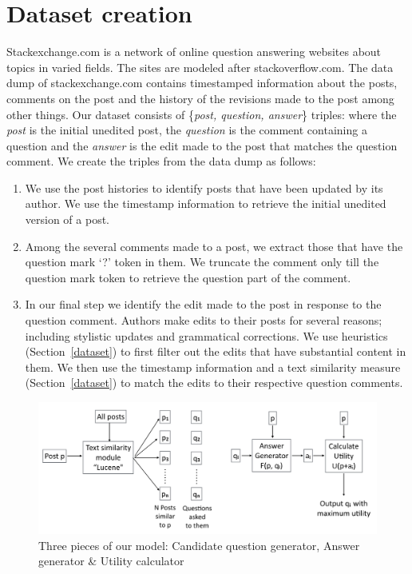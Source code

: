 \documentclass[11pt]{article}
\begin{document}
\section{Dataset creation}\label{dataset_creation}
Stackexchange.com is a network of online question answering websites about topics in varied fields. The sites are modeled after stackoverflow.com. The data dump of stackexchange.com contains timestamped information about the posts, comments on the post and the history of the revisions made to the post among other things. Our dataset consists of \{\textit{post, question, answer}\} triples: where the \textit{post} is the initial unedited post, the \textit{question} is the comment containing a question and the \textit{answer} is the edit made to the post that matches the question comment. We create the triples from the data dump as follows:
\begin{enumerate}
\item We use the post histories to identify posts that have been updated by its author. We use the timestamp information to retrieve the initial unedited version of a post.
\item Among the several comments made to a post, we extract those that have the question mark `?' token in them. We truncate the comment only till the question mark token to retrieve the question part of the comment.  
\item In our final step we identify the edit made to the post in response to the question comment. Authors make edits to their posts for several reasons; including stylistic updates and grammatical corrections. We use heuristics (Section~\ref{dataset}) to first filter out the edits that have substantial content in them. We then use the timestamp information and a text similarity measure (Section~\ref{dataset}) to match the edits to their respective question comments.
\end{enumerate}

\begin{figure}[!t]
\centering
\includegraphics[scale=0.40]{model}
\caption{Three pieces of our model: Candidate question generator, Answer generator \& Utility calculator}
\label{model}
\end{figure}
\end{document}
